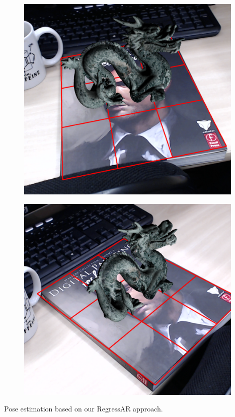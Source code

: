 \documentclass[annual]{acmsiggraph}
\begin{document}
{	\begin{subfigure}[c]{0.25\textwidth} \includegraphics[width=0.97\textwidth]{images/res_sig2016_3.png} \end{subfigure}%
	\begin{subfigure}[c]{0.25\textwidth} \includegraphics[width=0.97\textwidth]{images/res_sig2016_4.png} \end{subfigure}%
   	\caption{Pose estimation based on our RegressAR approach.}
   	\label{img:teaser}
 }
\end{document}
